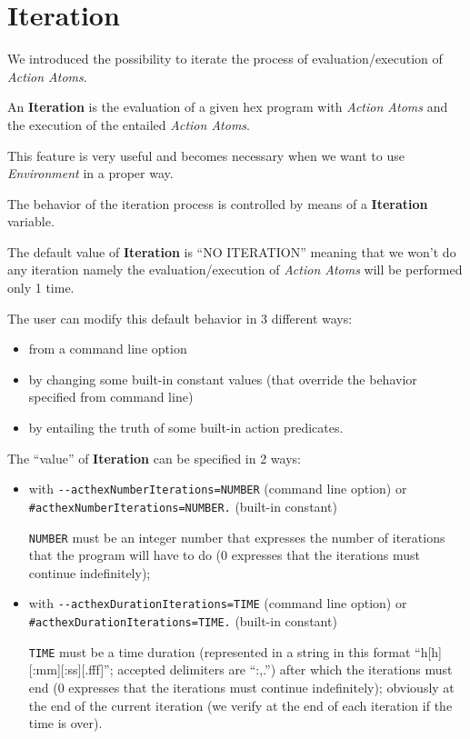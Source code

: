 \documentclass[a4paper, 11pt]{article}
\newcommand{\Iteration}{\textbf{Iteration}\xspace}
\begin{document}
	\section*{Iteration}
		We introduced the possibility to iterate the process of evaluation/execution of \textit{Action Atoms}.

		An \Iteration is the evaluation of a given hex program with \textit{Action Atoms} and the execution of the entailed \textit{Action Atoms}.

		This feature is very useful and becomes necessary when we want to use \textit{Environment} in a proper way.

		\vspace*{1em}

		The behavior of the iteration process is controlled by means of a \Iteration variable.

		The default value of \Iteration is ``NO ITERATION'' meaning that we won't do any iteration namely the evaluation/execution of \textit{Action Atoms} will be performed only 1 time.

		\vspace*{1em}

		The user can modify this default behavior in 3 different ways:
		\begin{itemize}
			\item from a command line option
			\item by changing some built-in constant values (that override the behavior specified from command line)
			\item by entailing the truth of some built-in action predicates.
		\end{itemize}

		\vspace*{1em}

		The ``value'' of \Iteration can be specified in 2 ways:
		\begin{itemize}
			\item with \verb|--acthexNumberIterations=NUMBER| (command line option) or \verb|#acthexNumberIterations=NUMBER.| (built-in constant)

				\verb|NUMBER| must be an integer number that expresses the number of iterations that the program will have to do (0 expresses that the iterations must continue indefinitely);

			\item with \verb|--acthexDurationIterations=TIME| (command line option) or \verb|#acthexDurationIterations=TIME.| (built-in constant)

				\verb|TIME| must be a time duration (represented in a string in this format ``h[h][:mm][:ss][.fff]''; accepted delimiters are ``\-:,.'') after which the iterations must end (0 expresses that the iterations must continue indefinitely); obviously at the end of the current iteration (we verify at the end of each iteration if the time is over).
		\end{itemize}
\end{document}
